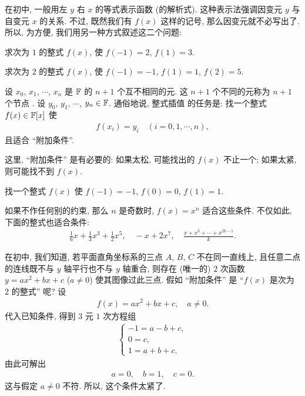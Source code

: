 在初中, 一般用左 $y$ 右 $x$ 的等式表示函数 (的解析式). 这种表示法强调因变元  $y$ 与自变元  $x$ 的关系. 不过, 既然我们有 $f(x)$ 这样的记号, 那么因变元就不必写出了. 所以, 为方便, 我们用另一种方式叙述这二个问题:

\begin{example}
    求次为 $1$ 的整式 $f(x)$, 使 $f(-1)=2$, $f(1)=3$.
\end{example}

\begin{example}
    求次为 $2$ 的整式 $f(x)$, 使 $f(-1)=-1$, $f(1)=1$, $f(2)=5$.
\end{example}

设 $x_0$, $x_1$, $\cdots$, $x_{n}$ 是 $\mathbb{F}$ 的 $n+1$ 个互不相同的元. 这 $n+1$ 个不同的元称为 $n+1$ 个节点 . 设 $y_0$, $y_1$, $\cdots$, $y_{n} \in \mathbb{F}$. 通俗地说, 整式插值  的任务是: 找一个整式 $f(x) \in \mathbb{F}[x]$ 使
\begin{align*}
    f(x_i) = y_i \quad (i = 0,1,\cdots,n),
\end{align*}
且适合 ``附加条件''.

这里, ``附加条件'' 是有必要的: 如果太松, 可能找出的 $f(x)$ 不止一个; 如果太紧, 则可能找不到 $f(x)$.

\begin{example}
    找一个整式 $f(x)$ 使 $f(-1)=-1$, $f(0)=0$, $f(1)=1$.

    如果不作任何别的约束, 那么 $n$ 是奇数时, $f(x) = x^n$ 适合这些条件. 不仅如此, 下面的整式也适合条件:
    \begin{align*}
        \frac{1}{6}x + \frac{1}{3}x^3 + \frac{1}{2}x^5, \quad -x + 2x^7, \quad \frac{x + x^3 + \cdots + x^{2k-1}}{k}.
    \end{align*}

    在初中, 我们知道, 若平面直角坐标系的三点 $A$, $B$, $C$ 不在同一直线上, 且任意二点的连线既不与 $y$ 轴平行也不与 $y$ 轴重合, 则存在 (唯一的) $2$ 次函数 $y = ax^2 + bx + c$ ($a \neq 0$) 使其图像过此三点. 假如 ``附加条件'' 是 ``$f(x)$ 是次为 $2$ 的整式'' 呢? 设
    \begin{align*}
        f(x) = ax^2 + bx + c, \quad a \neq 0.
    \end{align*}
    代入已知条件, 得到 $3$ 元 $1$ 次方程组
    \begin{align*}
        \begin{cases}
            -1 = a - b + c, \\
            0 = c,          \\
            1 = a + b + c.
        \end{cases}
    \end{align*}
    由此可解出
    \begin{align*}
        a = 0, \quad b = 1, \quad c = 0.
    \end{align*}
    这与假定 $a \neq 0$ 不符. 所以, 这个条件太紧了.
\end{example}

